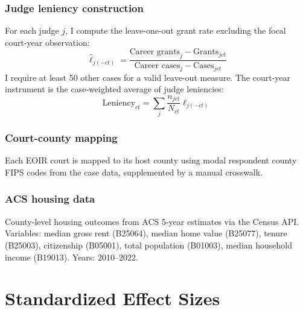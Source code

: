 \documentclass[12pt]{article}
\begin{document}
\subsubsection*{Judge leniency construction} For each judge $j$, I compute the leave-one-out grant rate excluding the focal court-year observation:
\[
\hat{\ell}_{j(-ct)} = \frac{\text{Career grants}_j - \text{Grants}_{jct}}{\text{Career cases}_j - \text{Cases}_{jct}}
\]
I require at least 50 other cases for a valid leave-out measure. The court-year instrument is the case-weighted average of judge leniencies:
\[
\text{Leniency}_{ct} = \sum_{j} \frac{n_{jct}}{N_{ct}} \hat{\ell}_{j(-ct)}
\]

\subsubsection*{Court-county mapping} Each EOIR court is mapped to its host county using modal respondent county FIPS codes from the case data, supplemented by a manual crosswalk.

\subsubsection*{ACS housing data} County-level housing outcomes from ACS 5-year estimates via the Census API. Variables: median gross rent (B25064), median home value (B25077), tenure (B25003), citizenship (B05001), total population (B01003), median household income (B19013). Years: 2010--2022.


\section{Standardized Effect Sizes}
\label{sec:sde}


\end{document}
